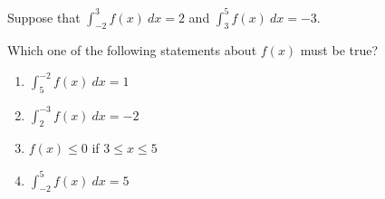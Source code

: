\item Suppose that $\displaystyle \int_{-2}^{3} f(x) \ dx = 2$ and $\displaystyle \int_{3}^{5} f(x) \ dx =- 3$.  

Which one of the following statements about $f(x)$ must be true?
\begin{multicols}{2}
\begin{enumerate}
\item $\displaystyle \int_{5}^{-2} f(x) \ dx = 1$ %
\item $\displaystyle \int_{2}^{-3} f(x) \ dx = -2 $
\item $f(x) \leq 0$ if $3 \leq x \leq 5$
\item $\displaystyle \int_{-2}^{5} f(x) \ dx = 5$
\end{enumerate}
\end{multicols}